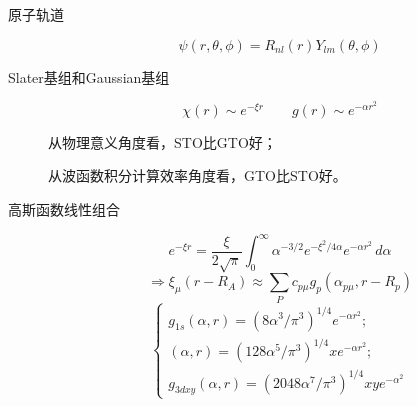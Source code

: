 \documentclass{article}
\numberwithin{equation}{section}
\begin{document}
\begin{description}
    \item[原子轨道]
    \begin{equation}
      \psi(r,\theta,\phi)=R_{nl}(r)Y_{lm}(\theta,\phi)
    \end{equation}
  
    \item[Slater基组和Gaussian基组]
    \begin{equation}
    \chi(r)\sim e^{-\xi r} \qquad g(r)\sim e^{-\alpha r^2}
    \end{equation}
  
    从物理意义角度看，STO比GTO好；
  
    从波函数积分计算效率角度看，GTO比STO好。
  
    \item[高斯函数线性组合]
    \begin{equation}
    e^{-\xi r}=\frac{\xi}{2\sqrt{\pi}}\int_0^\infty \alpha^{-3/2} e^{-\xi^2/4\alpha}e^{-\alpha r^2} \, d\alpha
    \end{equation}
    \begin{equation}
    \Rightarrow \xi_\mu(r-R_A)\approx \sum_Pc_{p\mu}g_p(\alpha_{p\mu},r-R_p)
    \end{equation}
    \begin{equation}
    \begin{cases}
    g_{1s}(\alpha,r)=(8\alpha^3/\pi^3)^{1/4}e^{-\alpha r^2};\\
    (\alpha,r)=(128\alpha^5/\pi^3)^{1/4}xe^{-\alpha r^2};\\
    g_{3dxy}(\alpha,r)=(2048\alpha^7/\pi^3)^{1/4}xye^{-\alpha^2}
    \end{cases}
    \end{equation}
  \end{description}
  
\end{document}

